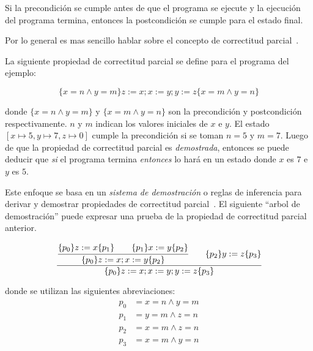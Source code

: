 \begin{displayquote}
Si la precondición se cumple antes de que el programa se ejecute y la ejecución del programa termina, entonces la postcondición se cumple para el estado final.
\end{displayquote}

Por lo general es mas sencillo hablar sobre el concepto de correctitud parcial~\citep{nipkow}.


La siguiente propiedad de correctitud parcial se define para el programa del ejemplo:

\begin{equation*}
\lbrace x=n \land y=m \rbrace z:=x; x:=y; y:=z \lbrace x=m \land y=n \rbrace
\end{equation*}

donde $\lbrace x=n \land y=m \rbrace $ y $\lbrace x=m \land y=n \rbrace $ son la precondición y postcondición respectivamente.
$n$ y $m$ indican los valores iniciales de $x$ e $y$.
El estado $[x\mapsto5, y\mapsto7, z\mapsto0]$ cumple la precondición si se toman $n=5$ y $m=7$.
Luego de que la propiedad de correctitud parcial es \textit{demostrada}, entonces se puede deducir que \textit{si} el programa termina \textit{entonces} lo hará en un estado donde $x$ es $7$ e $y$ es $5$.

Este enfoque se basa en un \textit{sistema de demostración} o reglas de inferencia para derivar y demostrar propiedades de correctitud parcial~\citep{nipkow}.
El siguiente ``arbol de demostración'' puede expresar una prueba de la propiedad de correctitud parcial anterior.
\begin{comment}
FIXME demostrar o probar
\end{comment}

\begin{equation*}
\cfrac{
  \cfrac{ \lbrace p_{0} \rbrace z:=x \lbrace p_{1} \rbrace \qquad \lbrace p_{1} \rbrace x:=y \lbrace p_{2} \rbrace }
    { \lbrace p_{0} \rbrace z:=x; x:=y \lbrace p_{2} \rbrace }
  \qquad
 \lbrace p_{2} \rbrace y:=z \lbrace p_{3} \rbrace
  }
  { \lbrace p_{0} \rbrace z:=x; x:=y; y:=z \lbrace p_{3} \rbrace }
\end{equation*}

donde se utilizan las siguientes abreviaciones:
\begin{align*}
p_{0} &= x=n \land y=m\\
p_{1} &= y=m \land z=n\\
p_{2} &= x=m \land z=n\\
p_{3} &= x=m \land y=n
\end{align*}

